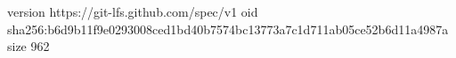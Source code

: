 version https://git-lfs.github.com/spec/v1
oid sha256:b6d9b11f9e0293008ced1bd40b7574bc13773a7c1d711ab05ce52b6d11a4987a
size 962
